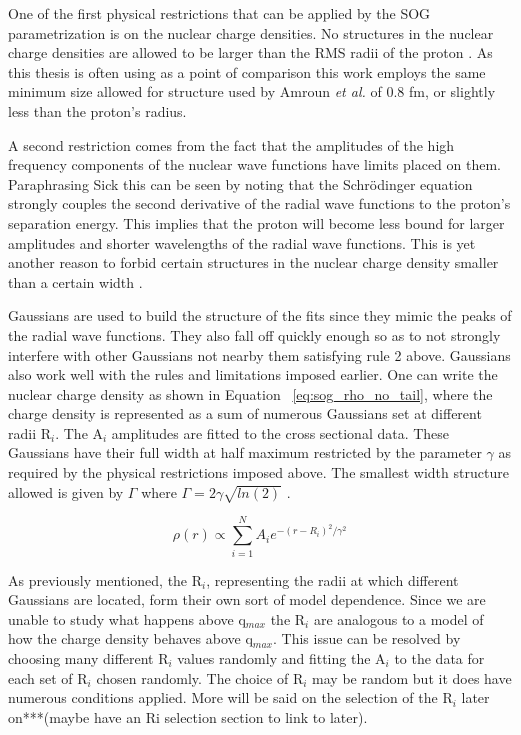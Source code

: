 One of the first physical restrictions that can be applied by the SOG parametrization is on the nuclear charge densities. No structures in the nuclear charge densities are allowed to be larger than the RMS radii of the proton \cite{Article:SOG}. As this thesis is often using \cite{Article:Amroun} as a point of comparison this work employs the same minimum size allowed for structure used by Amroun \textit{et al.} of 0.8 fm, or slightly less than the proton's radius. 

A second restriction comes from the fact that the amplitudes of the high frequency components of the nuclear wave functions have limits placed on them. Paraphrasing Sick this can be seen by noting that the Schr{\"o}dinger equation strongly couples the second derivative of the radial wave functions to the proton's separation energy. This implies that the proton will become less bound for larger amplitudes and shorter wavelengths of the radial wave functions. This is yet another reason to forbid certain structures in the nuclear charge density smaller than a certain width \cite{Article:SOG}.

Gaussians are used to build the structure of the fits since they mimic the peaks of the radial wave functions. They also fall off quickly enough so as to not strongly interfere with other Gaussians not nearby them satisfying rule 2 above. Gaussians also work well with the rules and limitations imposed earlier. One can write the nuclear charge density as shown in Equation ~\ref{eq:sog_rho_no_tail}, where the charge density is represented as a sum of numerous Gaussians set at different radii R$_i$. The A$_i$ amplitudes are fitted to the cross sectional data. These Gaussians have their full width at half maximum restricted by the parameter $\gamma$ as required by the physical restrictions imposed above. The smallest width structure allowed is given by $\Gamma$ where $\Gamma = 2\gamma \sqrt{ln(2)}$ \cite{Article:SOG}. 

\begin{equation} \label{eq:sog_rho_no_tail}
	\rho(r) \propto \sum_{i=1}^N A_i e^{-\left( r-R_i \right)^2/\gamma^2}
\end{equation}

As previously mentioned, the R$_i$, representing the radii at which different Gaussians are located, form their own sort of model dependence. Since we are unable to study what happens above q$_{max}$ the R$_i$ are analogous to a model of how the charge density behaves above q$_{max}$. This issue can be resolved by choosing many different R$_i$ values randomly and fitting the A$_i$ to the data for each set of R$_i$ chosen randomly. The choice of R$_i$ may be random but it does have numerous conditions applied. More will be said on the selection of the R$_i$ later on***(maybe have an Ri selection section to link to later). 

